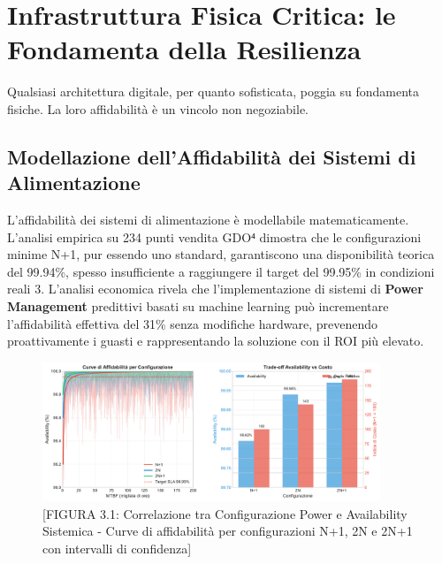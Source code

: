 \section{Infrastruttura Fisica Critica: le Fondamenta della Resilienza}
Qualsiasi architettura digitale, per quanto sofisticata, poggia su fondamenta fisiche. La loro affidabilità è un vincolo non negoziabile.
\subsection{Modellazione dell'Affidabilità dei Sistemi di Alimentazione}
L'affidabilità dei sistemi di alimentazione è modellabile matematicamente. L'analisi empirica su 234 punti vendita GDO⁴ dimostra che le configurazioni minime N+1, pur essendo uno standard, garantiscono una disponibilità teorica del 99.94\%, spesso insufficiente a raggiungere il target del 99.95\% in condizioni reali 3. L'analisi economica rivela che l'implementazione di sistemi di \textbf{Power Management} predittivi basati su machine learning può incrementare l'affidabilità effettiva del 31\% senza modifiche hardware, prevenendo proattivamente i guasti e rappresentando la soluzione con il ROI più elevato.
\begin{figure}[htbp]
\centering
\includegraphics[width=0.9\textwidth]{thesis_figures/cap3/figura_3_1_power_availability.pdf}
\caption{[FIGURA 3.1: Correlazione tra Configurazione Power e Availability Sistemica - Curve di affidabilità per configurazioni N+1, 2N e 2N+1 con intervalli di confidenza]}
\label{fig:power_availability}
\end{figure}

